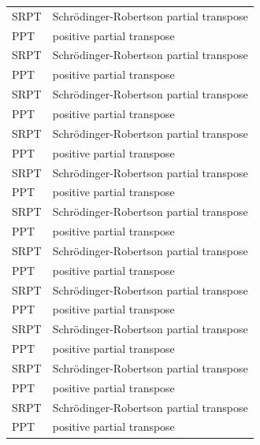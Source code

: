 \begin{xltabular}{\textwidth}{@{}l X@{}}
    SRPT & Schr\"odinger-Robertson partial transpose \\
    PPT  & positive partial transpose                \\
    SRPT & Schr\"odinger-Robertson partial transpose \\
    PPT  & positive partial transpose                \\
    SRPT & Schr\"odinger-Robertson partial transpose \\
    PPT  & positive partial transpose                \\
    SRPT & Schr\"odinger-Robertson partial transpose \\
    PPT  & positive partial transpose                \\
    SRPT & Schr\"odinger-Robertson partial transpose \\
    PPT  & positive partial transpose                \\
    SRPT & Schr\"odinger-Robertson partial transpose \\
    PPT  & positive partial transpose                \\
    SRPT & Schr\"odinger-Robertson partial transpose \\
    PPT  & positive partial transpose                \\
    SRPT & Schr\"odinger-Robertson partial transpose \\
    PPT  & positive partial transpose                \\
    SRPT & Schr\"odinger-Robertson partial transpose \\
    PPT  & positive partial transpose                \\
    SRPT & Schr\"odinger-Robertson partial transpose \\
    PPT  & positive partial transpose                \\
    SRPT & Schr\"odinger-Robertson partial transpose \\
    PPT  & positive partial transpose
\end{xltabular}
